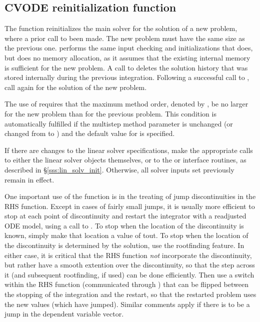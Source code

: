 \subsection{CVODE reinitialization function}\label{sss:cvreinit}

The function  reinitializes the main {\cvode} solver for
the solution of a new problem, where a prior call to 
been made. The new problem must have the same size as the previous one.
 performs the same input checking and initializations 
that  does, but does no memory allocation, as it assumes that the 
existing internal memory is sufficient for the new problem.
A call to  deletes the solution history that was stored
internally during the previous integration.  Following a successful call to
, call  again for the solution of the new problem.

The use of  requires that the maximum method order, denoted by 
, be no larger for the new problem than for the previous problem.
This condition is  
automatically fulfilled if the multistep method parameter   
is unchanged (or changed from  to ) and the default    
value for  is specified.

If there are changes to the linear solver specifications, make the
appropriate calls to either the linear solver objects themselves, or
to the {\cvdls} or {\cvspils} interface routines, as described in
\S\ref{sss:lin_solv_init}.  Otherwise, all solver inputs set
previously remain in effect.

One important use of the  function is in the treating
of jump discontinuities in the RHS function.  Except in cases of
fairly small jumps, it is usually more efficient to stop at each point
of discontinuity and restart the integrator with a readjusted ODE
model, using a call to .  To stop when the location of
the discontinuity is known, simply make that location a value of tout.
To stop when the location of the discontinuity is determined by the
solution, use the rootfinding feature.  In either case, it is critical
that the RHS function {\it not} incorporate the discontinuity, but
rather have a smooth extention over the discontinuity, so that the
step across it (and subsequent rootfinding, if used) can be done
efficiently.  Then use a switch within the RHS function (communicated
through ) that can be flipped between the stopping of
the integration and the restart, so that the restarted problem uses
the new values (which have jumped).  Similar comments apply if there
is to be a jump in the dependent variable vector.


